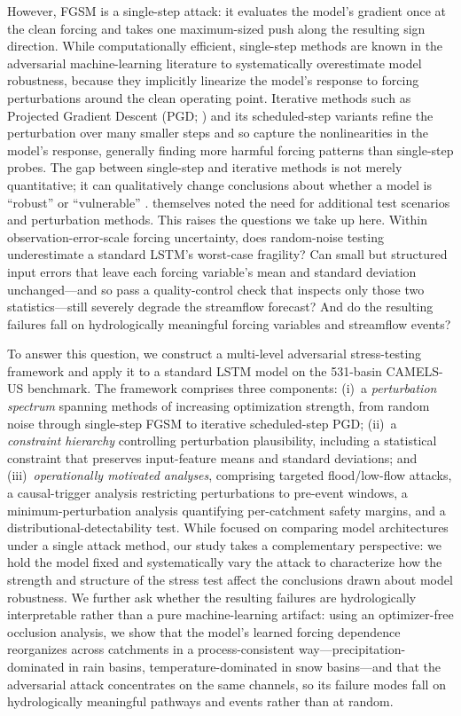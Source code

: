 \documentclass[final]{agujournal2019}
\begin{document}
However, FGSM is a single-step attack: it evaluates the model's gradient once at the clean forcing and takes one maximum-sized push along the resulting sign direction. While computationally efficient, single-step methods are known in the adversarial machine-learning literature to systematically overestimate model robustness, because they implicitly linearize the model's response to forcing perturbations around the clean operating point. Iterative methods such as Projected Gradient Descent (PGD; ) and its scheduled-step variants \cite{Croce2020} refine the perturbation over many smaller steps and so capture the nonlinearities in the model's response, generally finding more harmful forcing patterns than single-step probes. The gap between single-step and iterative methods is not merely quantitative; it can qualitatively change conclusions about whether a model is ``robust'' or ``vulnerable'' \cite{Carlini2019}.  themselves noted the need for additional test scenarios and perturbation methods. This raises the questions we take up here. Within observation-error-scale forcing uncertainty, does random-noise testing underestimate a standard LSTM's worst-case fragility? Can small but structured input errors that leave each forcing variable's mean and standard deviation unchanged---and so pass a quality-control check that inspects only those two statistics---still severely degrade the streamflow forecast? And do the resulting failures fall on hydrologically meaningful forcing variables and streamflow events?

To answer this question, we construct a multi-level adversarial stress-testing framework and apply it to a standard LSTM model on the 531-basin CAMELS-US benchmark. The framework comprises three components: (i)~a \textit{perturbation spectrum} spanning methods of increasing optimization strength, from random noise through single-step FGSM to iterative scheduled-step PGD; (ii)~a \textit{constraint hierarchy} controlling perturbation plausibility, including a statistical constraint that preserves input-feature means and standard deviations; and (iii)~\textit{operationally motivated analyses}, comprising targeted flood/low-flow attacks, a causal-trigger analysis restricting perturbations to pre-event windows, a minimum-perturbation analysis quantifying per-catchment safety margins, and a distributional-detectability test. While  focused on comparing model architectures under a single attack method, our study takes a complementary perspective: we hold the model fixed and systematically vary the attack to characterize how the strength and structure of the stress test affect the conclusions drawn about model robustness. We further ask whether the resulting failures are hydrologically interpretable rather than a pure machine-learning artifact: using an optimizer-free occlusion analysis, we show that the model's learned forcing dependence reorganizes across catchments in a process-consistent way---precipitation-dominated in rain basins, temperature-dominated in snow basins---and that the adversarial attack concentrates on the same channels, so its failure modes fall on hydrologically meaningful pathways and events rather than at random.
\end{document}
